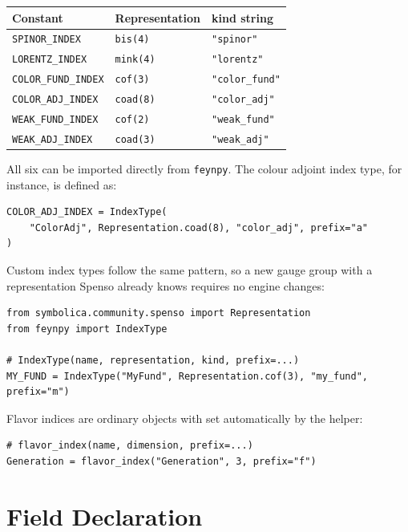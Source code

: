 \begin{center}
\begin{tabular}{@{}P{3.8cm}ll@{}}
\toprule
\normalfont\textbf{Constant} & \textbf{Representation} & \textbf{kind string} \\
\midrule
\texttt{SPINOR\_INDEX}     & \texttt{bis(4)}  & \texttt{"spinor"}     \\
\texttt{LORENTZ\_INDEX}    & \texttt{mink(4)} & \texttt{"lorentz"}    \\
\texttt{COLOR\_FUND\_INDEX}& \texttt{cof(3)}  & \texttt{"color\_fund"}\\
\texttt{COLOR\_ADJ\_INDEX} & \texttt{coad(8)} & \texttt{"color\_adj"} \\
\texttt{WEAK\_FUND\_INDEX} & \texttt{cof(2)}  & \texttt{"weak\_fund"} \\
\texttt{WEAK\_ADJ\_INDEX}  & \texttt{coad(3)} & \texttt{"weak\_adj"}  \\
\bottomrule
\end{tabular}
\end{center}

\noindent All six can be imported directly from \texttt{feynpy}. The colour adjoint index type, for instance, is defined as:
\begin{verbatim}
COLOR_ADJ_INDEX = IndexType(
    "ColorAdj", Representation.coad(8), "color_adj", prefix="a"
)
\end{verbatim}
\noindent Custom index types follow the same pattern, so a new gauge group
with a representation Spenso already knows requires no engine changes:

\begin{verbatim}
from symbolica.community.spenso import Representation
from feynpy import IndexType

# IndexType(name, representation, kind, prefix=...)
MY_FUND = IndexType("MyFund", Representation.cof(3), "my_fund", prefix="m")
\end{verbatim}

\noindent Flavor indices are ordinary  objects with
 set automatically by the helper:

\begin{verbatim}
# flavor_index(name, dimension, prefix=...)
Generation = flavor_index("Generation", 3, prefix="f")
\end{verbatim}

\section{Field Declaration}
\label{sec:feynpy-fields}

